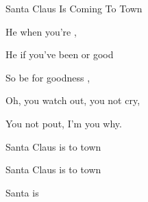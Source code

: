 \begin{SBSong}{Santa Claus Is Coming To Town}
\begin{SBVerse}
	He  when you're ,

	He  if you've been  or good

	So be  for goodness ,
  \end{SBVerse}
  \begin{SBVerse}
	Oh, you  watch out, you  not cry,

	You  not pout, I'm  you why.
	
	 Santa Claus is  to town

	 Santa Claus is  to town

	 Santa  is   
  \end{SBVerse}
\end{SBSong}

